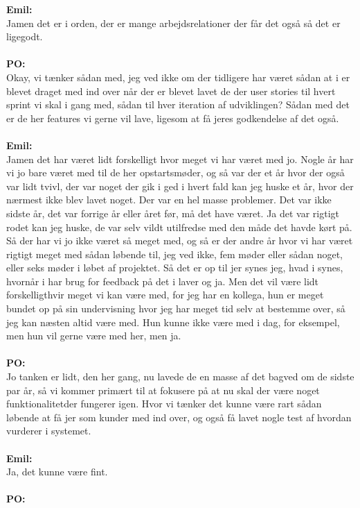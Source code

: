 \textbf{Emil:}\\
Jamen det er i orden, der er mange arbejdsrelationer der får det også så det er ligegodt.
\\\\
\textbf{PO:}\\
Okay, vi tænker sådan med, jeg ved ikke om der tidligere har været sådan at i er blevet draget med ind over når der er blevet lavet de der user stories til hvert sprint vi skal i gang med, sådan til hver iteration af udviklingen?
Sådan med det er de her features vi gerne vil lave, ligesom at få jeres godkendelse af det også.
\\\\
\textbf{Emil:}\\
Jamen det har været lidt forskelligt hvor meget vi har været med jo. Nogle år har vi jo bare været med til de her opstartsmøder, og så var der et år hvor der også var lidt tvivl, der var noget der gik i ged i hvert fald kan jeg huske et år, hvor der nærmest ikke blev lavet noget.
Der var en hel masse problemer. 
Det var ikke sidste år, det var forrige år eller året før, må det have været.
Ja det var rigtigt rodet kan jeg huske, de var selv vildt utilfredse med den måde det havde kørt på. 
Så der har vi jo ikke været så meget med, og så er der andre år hvor vi har været rigtigt meget med sådan løbende til, jeg ved ikke, fem møder eller sådan noget, eller seks møder i løbet af projektet.
Så det er op til jer synes jeg, hvad i synes, hvornår i har brug for feedback på det i laver og ja.
Men det vil være lidt forskelligthvir meget vi kan være med, for jeg har en kollega, hun er meget bundet op på sin undervisning hvor jeg har meget tid selv at bestemme over, så jeg kan næsten altid være med.
Hun kunne ikke være med i dag, for eksempel, men hun vil gerne være med her, men ja. 
\\\\
\textbf{PO:}\\
Jo tanken er lidt, den her gang, nu lavede de en masse af det bagved om de sidste par år, så vi kommer primært til at fokusere på at nu skal der være noget funktionalitetder fungerer igen. 
Hvor vi tænker det kunne være rart sådan løbende at få jer som kunder med ind over, og også få lavet nogle test af hvordan vurderer i systemet.
\\\\
\textbf{Emil:}\\
Ja, det kunne være fint.
\\\\
\textbf{PO:}\\
